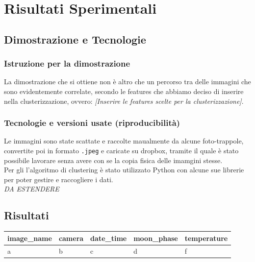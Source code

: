 \documentclass[12pt,a4paper,twoside]{article}
\begin{document}
\section{Risultati Sperimentali}

\subsection{Dimostrazione e Tecnologie}
\subsubsection{Istruzione per la dimostrazione}
La dimostrazione che si ottiene non è altro che un percorso tra delle immagini che sono 
evidentemente correlate, secondo le features che abbiamo deciso di inserire nella clusterizzazione, 
ovvero: \textit{[Inserire le features scelte per la clusterizzazione]}.
\subsubsection{Tecnologie e versioni usate (riproducibilità)}
Le immagini sono state scattate e raccolte maualmente da alcune foto-trappole, convertite poi in 
formato \texttt{.jpeg} e caricate su dropbox, tramite il quale è stato possibile lavorare senza 
avere con se la copia fisica delle imamgini stesse.\\ 
Per gli l'algoritmo di clustering è stato utilizzato Python con alcune sue librerie per poter 
gestire e raccogliere i dati.\\
\textit{DA ESTENDERE} 

\subsection{Risultati}

\setlength{\tabcolsep}{0.5em} %
{\renewcommand{\arraystretch}{1.5} %
    \begin{tabular}{|l|l|l|l|l|}
        \hline
        \textbf{image\_name} & \textbf{camera} & \textbf{date\_time} & \textbf{moon\_phase} & \textbf{temperature} \\ 
        \hline
        a & b & c & d & f\\
        \hline
    \end{tabular}
}
\end{document}
